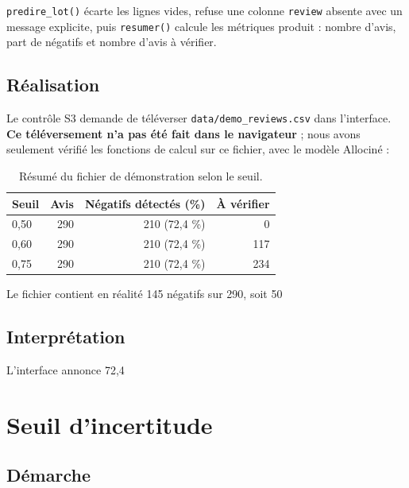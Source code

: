\documentclass[11pt,a4paper]{article}
\begin{document}
\texttt{predire\_lot()} écarte les lignes vides, refuse une colonne \texttt{review} absente avec un message explicite, puis \texttt{resumer()} calcule les métriques produit : nombre d'avis, part de négatifs et nombre d'avis à vérifier.

\subsection{Réalisation}

Le contrôle S3 demande de téléverser \texttt{data/demo\_reviews.csv} dans l'interface. \textbf{Ce téléversement n'a pas été fait dans le navigateur} ; nous avons seulement vérifié les fonctions de calcul sur ce fichier, avec le modèle Allociné :

\begin{table}[H]
\centering
\begin{tabular}{lrrr}
\toprule
\textbf{Seuil} & \textbf{Avis} & \textbf{Négatifs détectés (\%)} & \textbf{À vérifier} \\
\midrule
0,50 & 290 & 210 (72,4 \%) & 0 \\
0,60 & 290 & 210 (72,4 \%) & 117 \\
0,75 & 290 & 210 (72,4 \%) & 234 \\
\bottomrule
\end{tabular}
\caption{Résumé du fichier de démonstration selon le seuil.}
\end{table}

Le fichier contient en réalité 145 négatifs sur 290, soit 50 %

\subsection{Interprétation}

L'interface annonce 72,4 %

\section{Seuil d'incertitude}

\subsection{Démarche}
\end{document}
